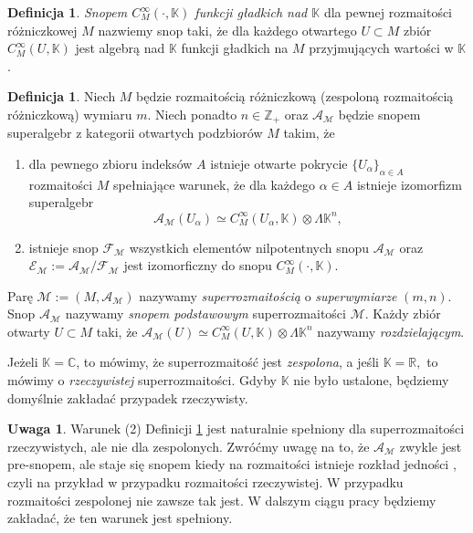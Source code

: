 \documentclass[11pt,a4paper]{report}
\theoremstyle{definition}
\newtheorem{definition}[theorem]{Definicja}
\newtheorem{remark}[theorem]{Uwaga}
\begin{document}
\begin{definition}
\textit{Snopem $C^\infty_M (\cdot, \mathbb{K})$ funkcji gładkich nad $\mathbb{K}$} dla pewnej rozmaitości różniczkowej $M$ nazwiemy snop taki, że dla każdego otwartego $U \subset M$ zbiór $C^\infty_M (U,\mathbb{K})$ jest algebrą nad $\mathbb{K}$ funkcji gładkich na $M$ przyjmujących wartości w $\mathbb{K}$. 
\end{definition}

\begin{definition}
\label{def:supermanifold}
Niech $M$ będzie rozmaitością różniczkową (zespoloną rozmaitością różniczkową) wymiaru $m$. Niech ponadto $n \in \mathbb{Z}_+$ oraz $\mathcal{A}_\mathcal{M}$ będzie snopem superalgebr z kategorii otwartych podzbiorów $M$ takim, że
 \begin{enumerate}[(1)]
  \item dla pewnego zbioru indeksów $A$ istnieje otwarte pokrycie $\{ U_\alpha \}_{\alpha \in A}$ rozmaitości $M$ spełniające warunek, że dla każdego $\alpha \in A$ istnieje izomorfizm superalgebr
  \begin{equation*}
   \mathcal{A}_\mathcal{M} (U_\alpha) \simeq C^\infty _M (U_\alpha, \mathbb{K}) \otimes \Lambda \mathbb{K}^n,
  \end{equation*}
  \item istnieje snop $\mathcal{F}_\mathcal{M}$ wszystkich elementów nilpotentnych snopu $\mathcal{A}_\mathcal{M}$ oraz $\mathcal{E}_\mathcal{M} := \mathcal{A}_\mathcal{M} / \mathcal{F}_\mathcal{M}$ jest izomorficzny do snopu $C^\infty_M ( \cdot, \mathbb{K})$.
 \end{enumerate}
Parę $\mathcal{M} := (M, \mathcal{A}_\mathcal{M})$ nazywamy \textit{superrozmaitością} o \textit{superwymiarze} $(m,n)$. Snop $\mathcal{A}_\mathcal{M}$ nazywamy \textit{snopem podstawowym} superrozmaitości $\mathcal{M}$. Każdy zbiór otwarty $U \subset M$ taki, że $\mathcal{A}_\mathcal{M} (U) \simeq C^\infty_M (U, \mathbb{K}) \otimes \Lambda \mathbb{K}^n$ nazywamy \textit{rozdzielającym}.

Jeżeli $\mathbb{K}=\mathbb{C}$, to mówimy, że superrozmaitość jest \textit{zespolona}, a jeśli $\mathbb{K}=\mathbb{R},$ to mówimy o \textit{rzeczywistej} superrozmaitości. Gdyby $\mathbb{K}$ nie było ustalone, będziemy domyślnie zakładać przypadek rzeczywisty.
\end{definition}

\begin{remark}
 Warunek (2) Definicji \ref{def:supermanifold} jest naturalnie spełniony dla superrozmaitości rzeczywistych, ale nie dla zespolonych. Zwróćmy uwagę na to, że $\mathcal{A}_\mathcal{M}$ zwykle jest pre-snopem, ale staje się snopem kiedy na rozmaitości istnieje rozkład jedności \cite{covolo}, czyli na przykład w przypadku rozmaitości rzeczywistej. W przypadku rozmaitości zespolonej nie zawsze tak jest. W dalszym ciągu pracy będziemy zakładać, że ten warunek jest spełniony.
\end{remark}
\end{document}
